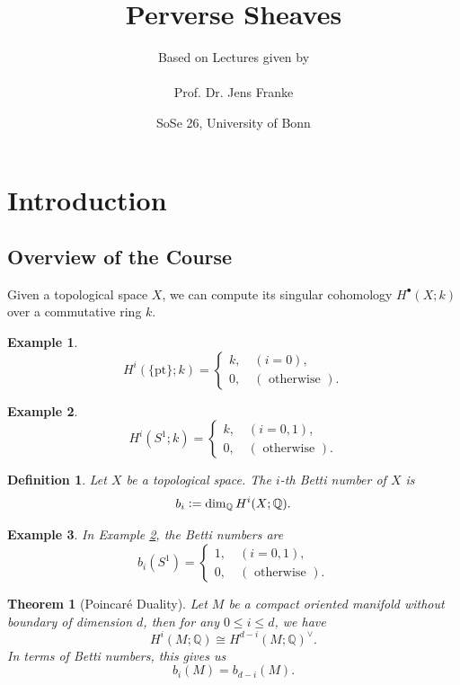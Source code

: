 \documentclass[8pt]{article}
\title{Perverse Sheaves}
\author{Based on Lectures given by\\\\Prof. Dr. Jens Franke}
\date{SoSe 26, University of Bonn}
\numberwithin{equation}{section}
\newtheorem{theorem}{Theorem} [section]
\newtheorem{definition}{Definition}[section]
\newtheorem{example}{Example}[section]
\newcommand{\defeq}{\vcentcolon=}
\newcommand{\Q}[0]{\mathbb{Q}}
\newcommand{\otherwise}[0]{\text{ otherwise }}
\begin{document}
\maketitle
\section{Introduction}
\subsection{Overview of the Course}
Given a topological space $X$, we can compute its singular cohomology $H^\bullet(X;k)$ over a commutative ring $k$.
\begin{example}
    \begin{equation*}
        H^i(\{\mathrm{pt}\};k)=\begin{cases}
            k,\quad(i=0),\\
            0,\quad(\otherwise).
        \end{cases}
    \end{equation*}
    \label{example_1_1}
\end{example}
\begin{example}
    \begin{equation*}
        H^i(S^1;k)=\begin{cases}
            k,\quad(i=0,1),\\
            0,\quad(\otherwise).
        \end{cases}
    \end{equation*}
    \label{example_1_2}
\end{example}
\begin{definition}
    \label{definition_1_1}
    Let $X$ be a topological space. The $i$-th Betti number of $X$ is 
    \begin{equation*}
        b_i\defeq \dim_\Q H^i(X;\Q).
    \end{equation*}
\end{definition}
\begin{example}
    \label{example_1_3}
    In Example \ref{example_1_2}, the Betti numbers are 
    \begin{equation*}
        b_i(S^1) = \begin{cases}
            1,\quad(i=0,1),\\
            0,\quad(\otherwise).
        \end{cases}
    \end{equation*}
\end{example}
\begin{theorem}[Poincaré Duality]
    \label{theorem_1_1}
    Let $M$ be a compact oriented manifold without boundary of dimension $d$, then for any $0\leq i\leq d$, we have 
    \begin{equation*}
        H^i(M;\Q)\cong H^{d-i}(M;\Q)^\vee.
    \end{equation*}
    In terms of Betti numbers, this gives us
    \begin{equation*}
        b_i(M) = b_{d-i}(M).
    \end{equation*}
\end{theorem}
\end{document}
